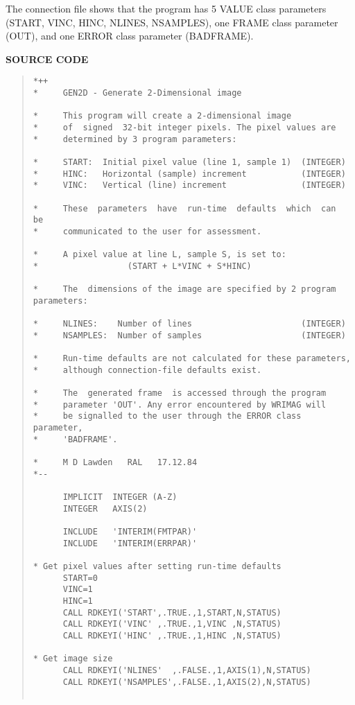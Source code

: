 \documentclass{article}
\begin{document}
The connection file shows that the program has 5 VALUE class parameters
(START, VINC, HINC, NLINES, NSAMPLES), one FRAME class parameter (OUT), and one
ERROR class parameter (BADFRAME).
\vspace{5mm}
\begin{center}
{\bf SOURCE CODE}
\end{center}
\begin{quote}
\begin{verbatim}
*++
*     GEN2D - Generate 2-Dimensional image

*     This program will create a 2-dimensional image
*     of  signed  32-bit integer pixels. The pixel values are
*     determined by 3 program parameters:

*     START:  Initial pixel value (line 1, sample 1)  (INTEGER)
*     HINC:   Horizontal (sample) increment           (INTEGER)
*     VINC:   Vertical (line) increment               (INTEGER)

*     These  parameters  have  run-time  defaults  which  can  be
*     communicated to the user for assessment.

*     A pixel value at line L, sample S, is set to:
*                  (START + L*VINC + S*HINC)

*     The  dimensions of the image are specified by 2 program parameters:

*     NLINES:    Number of lines                      (INTEGER)
*     NSAMPLES:  Number of samples                    (INTEGER)

*     Run-time defaults are not calculated for these parameters,
*     although connection-file defaults exist.

*     The  generated frame  is accessed through the program
*     parameter 'OUT'. Any error encountered by WRIMAG will
*     be signalled to the user through the ERROR class parameter,
*     'BADFRAME'.

*     M D Lawden   RAL   17.12.84
*--

      IMPLICIT  INTEGER (A-Z)
      INTEGER   AXIS(2)

      INCLUDE   'INTERIM(FMTPAR)'
      INCLUDE   'INTERIM(ERRPAR)'

* Get pixel values after setting run-time defaults
      START=0
      VINC=1
      HINC=1
      CALL RDKEYI('START',.TRUE.,1,START,N,STATUS)
      CALL RDKEYI('VINC' ,.TRUE.,1,VINC ,N,STATUS)
      CALL RDKEYI('HINC' ,.TRUE.,1,HINC ,N,STATUS)

* Get image size
      CALL RDKEYI('NLINES'  ,.FALSE.,1,AXIS(1),N,STATUS)
      CALL RDKEYI('NSAMPLES',.FALSE.,1,AXIS(2),N,STATUS)


\end{verbatim}
\end{quote}
\end{document}
